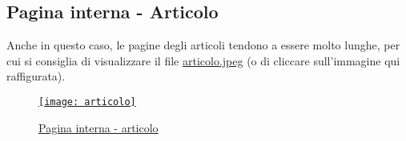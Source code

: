 \subsection{Pagina interna - Articolo}
\label{sub:articolo}
Anche in questo caso, le pagine degli articoli tendono a essere molto lunghe, per cui si consiglia di visualizzare il file \href{pic/articolo.jpeg}{\underline{articolo.jpeg}} (o di cliccare sull'immagine qui raffigurata).
\begin{figure}[h]
\centering
\href{pic/articolo.jpeg}{\texttt{[image: articolo]}}
\caption{\href{pic/articolo.jpeg}{Pagina interna - articolo}} %
\end{figure}

